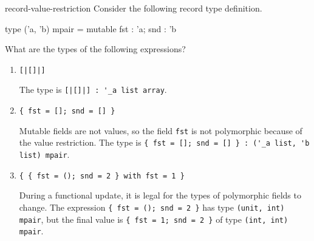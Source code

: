 %
\begin{exercise}{record-value-restriction}
Consider the following record type definition.

\begin{ocaml}
type ('a, 'b) mpair = { mutable fst : 'a; snd : 'b }
\end{ocaml}
%
What are the types of the following expressions?

\begin{enumerate}
\item \lstinline$[|[]|]$

\begin{answer}\ifanswers
The type is \hbox{\lstinline/[|[]|] : '_a list array/}.
\fi\end{answer}

\item \lstinline+{ fst = []; snd = [] }+

\begin{answer}\ifanswers
Mutable fields are not values, so the field \hbox{\lstinline/fst/} is not polymorphic because of the value restriction.
The type is \hbox{\lstinline/{ fst = []; snd = [] } : ('_a list, 'b list) mpair/}.
\fi\end{answer}

\item \lstinline+{ { fst = (); snd = 2 } with fst = 1 }+

\begin{answer}\ifanswers
During a functional update, it is legal for the types of polymorphic fields to change.
The expression \hbox{\lstinline/{ fst = (); snd = 2 }/} has type \hbox{\lstinline/(unit, int) mpair/},
but the final value is \hbox{\lstinline/{ fst = 1; snd = 2 }/} of type \hbox{\lstinline/(int, int) mpair/}.
\fi\end{answer}
\end{enumerate}
\end{exercise}

